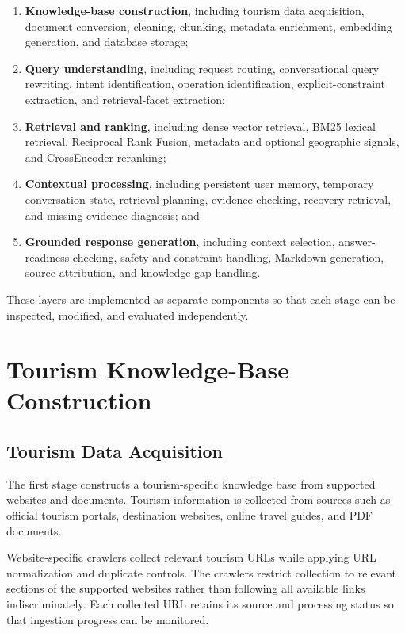 \begin{enumerate}[label=(\roman*)]
    \item \textbf{Knowledge-base construction}, including tourism data
    acquisition, document conversion, cleaning, chunking, metadata enrichment,
    embedding generation, and database storage;

    \item \textbf{Query understanding}, including request routing,
    conversational query rewriting, intent identification, operation
    identification, explicit-constraint extraction, and retrieval-facet
    extraction;

    \item \textbf{Retrieval and ranking}, including dense vector retrieval,
    BM25 lexical retrieval, Reciprocal Rank Fusion, metadata and optional
    geographic signals, and CrossEncoder reranking;

    \item \textbf{Contextual processing}, including persistent user memory,
    temporary conversation state, retrieval planning, evidence checking,
    recovery retrieval, and missing-evidence diagnosis; and

    \item \textbf{Grounded response generation}, including context selection,
    answer-readiness checking, safety and constraint handling, Markdown
    generation, source attribution, and knowledge-gap handling.
\end{enumerate}

These layers are implemented as separate components so that each stage can be
inspected, modified, and evaluated independently.

\section{Tourism Knowledge-Base Construction}

\subsection{Tourism Data Acquisition}

The first stage constructs a tourism-specific knowledge base from supported
websites and documents. Tourism information is collected from sources such as
official tourism portals, destination websites, online travel guides, and PDF
documents.

Website-specific crawlers collect relevant tourism URLs while applying URL
normalization and duplicate controls. The crawlers restrict collection to
relevant sections of the supported websites rather than following all
available links indiscriminately. Each collected URL retains its source and
processing status so that ingestion progress can be monitored.

